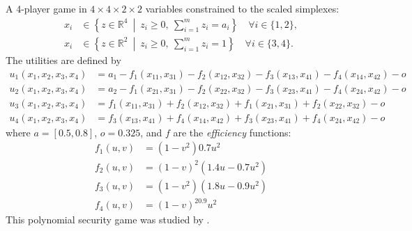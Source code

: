 \begin{game}\label{ex.kroupa21.6}
A 4-player game in $4 \times 4 \times 2 \times 2$ variables constrained to the scaled simplexes:
\begin{align*}
x_i &\in \left\{ z \in \mathbb{R}^4 \ \middle|\ z_i \ge 0,\ \sum_{i=1}^m z_i = a_i \right\} \quad \forall i \in \{1,2\},\\
x_i &\in \left\{ z \in \mathbb{R}^2 \ \middle|\ z_i \ge 0,\ \sum_{i=1}^m z_i = 1 \right\} \quad \forall i \in \{3,4\}.
\end{align*}
The utilities are defined by
\begin{align*}
u_1(x_1, x_2, x_3, x_4) &= a_{1} - f_{1}(x_{11}, x_{31}) - f_{2}(x_{12}, x_{32}) - f_{3}(x_{13}, x_{41}) - f_{4}(x_{14}, x_{42}) - o \\
u_2(x_1, x_2, x_3, x_4) &= a_{2} - f_{1}(x_{21}, x_{31}) - f_{2}(x_{22}, x_{32}) - f_{3}(x_{23}, x_{41}) - f_{4}(x_{24}, x_{42}) - o \\
u_3(x_1, x_2, x_3, x_4) &= f_{1}(x_{11}, x_{31}) + f_{2}(x_{12}, x_{32}) + f_{1}(x_{21}, x_{31}) + f_{2}(x_{22}, x_{32}) -  o \\
u_4(x_1, x_2, x_3, x_4) &= f_{3}(x_{13}, x_{41}) + f_{4}(x_{14}, x_{42}) + f_{3}(x_{23}, x_{41}) + f_{4}(x_{24}, x_{42})  -  o
\end{align*}
where $a=[0.5, 0.8]$, $o=0.325$, and $f$ are the \emph{efficiency} functions:
\begin{align*}
f_1(u,v) &= (1-v^2)0.7u^2\\
f_2(u,v) &= (1-v)^2(1.4u - 0.7u^2)\\
f_3(u,v) &= (1-v^2)(1.8u - 0.9u^2)\\
f_4(u,v) &= (1-v)^20.9u^2
\end{align*}
This polynomial security game was studied by \textcite[Example~6]{kroupa21separablenetworkgames}.
\end{game}


